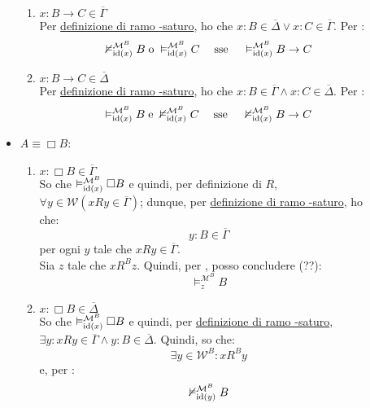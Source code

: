 \documentclass[a4paper,12pt]{article}
\newcommand{\latinmodern}[1]{\text{#1}}
\newcommand{\latinmath}[1]{\text{\latinmodern{#1}}} %
\begin{document}
\begin{dimo}
\begin{description}
\begin{itemize}
			            \begin{enumerate}
				            \item $x:B \to C \in \overline{\Gamma}$ \\
				                  Per \hyperlink{lsat}{definizione di ramo \latinmath{L}-saturo}, ho che $x:B \in \overline{\Delta} \lor x:C \in \overline{\Gamma}$. Per \latinmath{IH}:
				                  $$\nvDash_{\latinmath{id}(x)}^{\mathcal{M}^{B}} B \; \text{o} \; \vDash_{\latinmath{id}(x)}^{\mathcal{M}^{B}} C \quad \; \text{sse} \; \quad \vDash_{\latinmath{id}(x)}^{\mathcal{M}^{B}} B \to C$$
				            \item $x:B \to C \in \overline{\Delta}$ \\
				                  Per \hyperlink{lsat}{definizione di ramo \latinmath{L}-saturo}, ho che $x:B \in \overline{\Gamma} \land x:C \in \overline{\Delta}$. Per \latinmath{IH}:
				                  $$\vDash_{\latinmath{id}(x)}^{\mathcal{M}^{B}} B \; \text{e} \; \nvDash_{\latinmath{id}(x)}^{\mathcal{M}^{B}} C \quad \; \text{sse} \; \quad \nvDash_{\latinmath{id}(x)}^{\mathcal{M}^{B}} B \to C$$
			            \end{enumerate}
			      \item $A \equiv \Box B$:
			            \begin{enumerate}
				            \item $x: \Box B \in \overline{\Gamma}$ \\
				                  So che $\vDash_{\latinmath{id}(x)}^{\mathcal{M}^{B}} \Box B$ e quindi, per definizione di $R$, $\forall y \in \mathcal{W} (xRy \in \overline{\Gamma})$; dunque, per \hyperlink{lsat}{definizione di ramo \latinmath{L}-saturo}, ho che:
				                  $$y:B \in \overline{\Gamma}$$
				                  per ogni $y$ tale che $xRy \in \overline{\Gamma}$. \\
				                  Sia $z$ tale che $xR^Bz$. Quindi, per \latinmath{IH}, posso concludere (??):
				                  $$\vDash_z^{\mathcal{M}^{B}} B$$
				            \item $x: \Box B \in \overline{\Delta}$ \\
				                  So che $\vDash_{\latinmath{id}(x)}^{\mathcal{M}^{B}} \Box B$ e quindi, per \hyperlink{lsat}{definizione di ramo \latinmath{L}-saturo}, $\exists y : xRy \in \overline{\Gamma} \land y:B \in \overline{\Delta}$. Quindi, so che:
				                  $$\exists y \in \mathcal{W}^{B} : xR^By$$
				                  e, per \latinmath{IH}:
				                  $$\nvDash_{\latinmath{id}(y)}^{\mathcal{M}^{B}} B $$

\end{enumerate}
\end{itemize}
\end{description}
\end{dimo}
\end{document}
